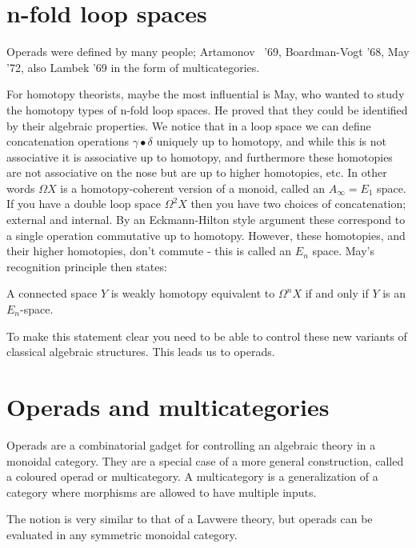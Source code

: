 \section{n-fold loop spaces}
Operads were defined by many people; Artamonov ~'69, Boardman-Vogt '68, May '72, also Lambek '69 in the form of multicategories.

For homotopy theorists, maybe the most influential is May, who wanted to study the homotopy types of n-fold loop spaces. He proved that they could be identified by their algebraic properties. We notice that in a loop space we can define concatenation operations $\gamma \bullet \delta$ uniquely up to homotopy, and while this is not associative it is associative up to homotopy, and furthermore these homotopies are not associative on the nose but are up to higher homotopies, etc. In other words $\Omega X$ is a homotopy-coherent version of a monoid, called an $A_\infty=E_1$ space. If you have a double loop space $\Omega^2 X$ then you have two choices of concatenation; external and internal. By an Eckmann-Hilton style argument these correspond to a single operation commutative up to homotopy. However, these homotopies, and their higher homotopies, don't commute - this is called an $E_n$ space. May's recognition principle then states: 
\begin{theorem}[May]
    A connected space $Y$ is weakly homotopy equivalent to $\Omega^nX$ if and only if $Y$ is an $E_n$-space.
\end{theorem}

To make this statement clear you need to be able to control these new variants of classical algebraic structures. This leads us to operads.

\section{Operads and multicategories}
Operads are a combinatorial gadget for controlling an algebraic theory in a monoidal category. They are a special case of a more general construction, called a coloured operad or multicategory. A multicategory is a generalization of a category where morphisms are allowed to have multiple inputs.

The notion is very similar to that of a Lavwere theory, but operads can be evaluated in any symmetric monoidal category.

